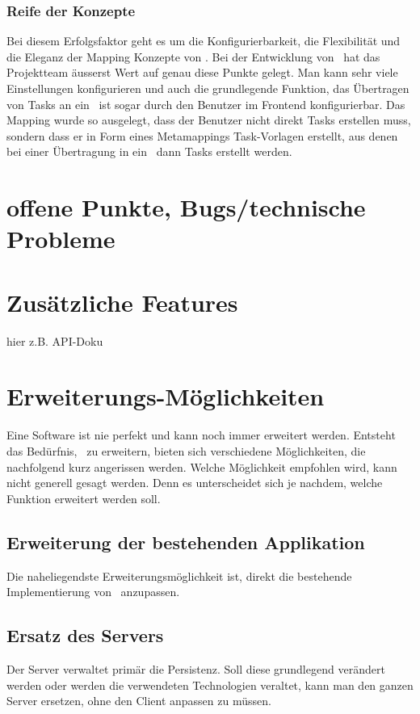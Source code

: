 		\subsubsection{Reife der Konzepte}
			Bei diesem Erfolgsfaktor geht es um die Konfigurierbarkeit, die Flexibilität und die Eleganz der Mapping Konzepte von \eeppi.
			Bei der Entwicklung von \eeppi\ hat das Projektteam äusserst Wert auf genau diese Punkte gelegt.
			Man kann sehr viele Einstellungen konfigurieren und auch die grundlegende Funktion,
			das Übertragen von Tasks an ein \ppt\ ist sogar durch den Benutzer im Frontend konfigurierbar.
			Das Mapping wurde so ausgelegt, dass der Benutzer nicht direkt Tasks erstellen muss,
			sondern dass er in Form eines Metamappings Task-Vorlagen erstellt,
			aus denen bei einer Übertragung in ein \ppt\ dann Tasks erstellt werden.


	
	\section{offene Punkte, Bugs/technische Probleme}
	
	
	\section{Zusätzliche Features}
	hier z.B. API-Doku
	
	
	
	\section{Erweiterungs-Möglichkeiten}
		Eine Software ist nie perfekt und kann noch immer erweitert werden.
		Entsteht das Bedürfnis, \eeppi\ zu erweitern, bieten sich verschiedene Möglichkeiten, die nachfolgend kurz angerissen werden.
		Welche Möglichkeit empfohlen wird, kann nicht generell gesagt werden.
		Denn es unterscheidet sich je nachdem, welche Funktion erweitert werden soll.

		\subsection{Erweiterung der bestehenden Applikation}
			Die naheliegendste Erweiterungsmöglichkeit ist, direkt die bestehende Implementierung von \eeppi\ anzupassen.
	
		\subsection{Ersatz des Servers}
			Der Server verwaltet primär die Persistenz.
			Soll diese grundlegend verändert werden oder werden die verwendeten Technologien veraltet,
			kann man den ganzen Server ersetzen, ohne den Client anpassen zu müssen.
	
